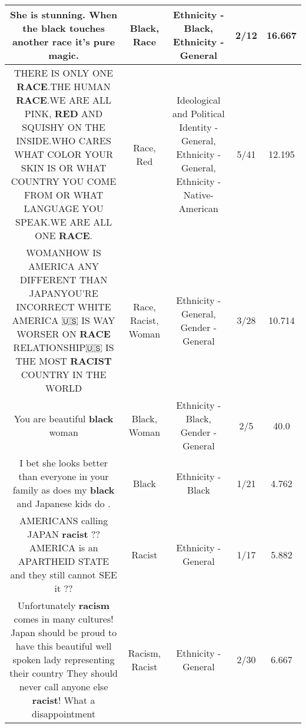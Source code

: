 \documentclass[11pt]{article}
\newlength\mylength
\begin{document}
\begin{center}
\begin{longtable}{|C{.65\mylength}|C{.30\mylength}|C{.12\mylength}|C{.12\mylength}|C{.12\mylength}|}
  \small She is stunning. When the \textbf{black} touches another \textbf{race} it's pure magic.\normalsize   & Black, Race & Ethnicity - Black, Ethnicity - General & 2/12 & 16.667 \\  \hline
  \small THERE IS ONLY ONE \textbf{RACE}.THE HUMAN \textbf{RACE}.WE ARE ALL PINK, \textbf{R\textbf{ED}} AND SQUISHY ON THE INSIDE.WHO CARES WHAT COLOR YOUR SKIN IS OR WHAT COUNTRY YOU COME FROM OR WHAT LANGUAGE YOU SPEAK.WE ARE ALL ONE \textbf{RACE}.\normalsize   & Race, Red &  Ideological and Political Identity - General, Ethnicity - General, Ethnicity - Native-American & 5/41 & 12.195 \\  \hline
  \small WOMANHOW IS AMERICA ANY DIFFERENT THAN JAPANYOU'RE INCORRECT WHITE AMERICA 🇺🇸 IS WAY WORSER ON \textbf{RACE} RELATIONSHIP🇺🇸 IS THE MOST \textbf{RACIST} COUNTRY IN THE WORLD\normalsize   & Race, Racist, Woman & Ethnicity - General, Gender - General & 3/28 & 10.714 \\  \hline
  \small You are beautiful \textbf{black} woman\normalsize   & Black, Woman & Ethnicity - Black, Gender - General & 2/5 & 40.0 \\  \hline
  \small {} I bet she looks better than everyone in your family as does my \textbf{black} and Japanese kids do .\normalsize   & Black & Ethnicity - Black & 1/21 & 4.762 \\  \hline
  \small AMERICANS calling JAPAN \textbf{racist}  ?? AMERICA is an APARTHEID STATE and they still cannot SEE it ??\normalsize   & Racist & Ethnicity - General & 1/17 & 5.882 \\  \hline
  \small Unfortunately \textbf{racism} comes in many cultures! Japan should be proud to have this beautiful well spoken lady representing their country They should never call anyone else \textbf{racist}! What a disappointment\normalsize   & Racism, Racist & Ethnicity - General & 2/30 & 6.667 \\  \hline

\end{longtable}
\end{center}
\end{document}
